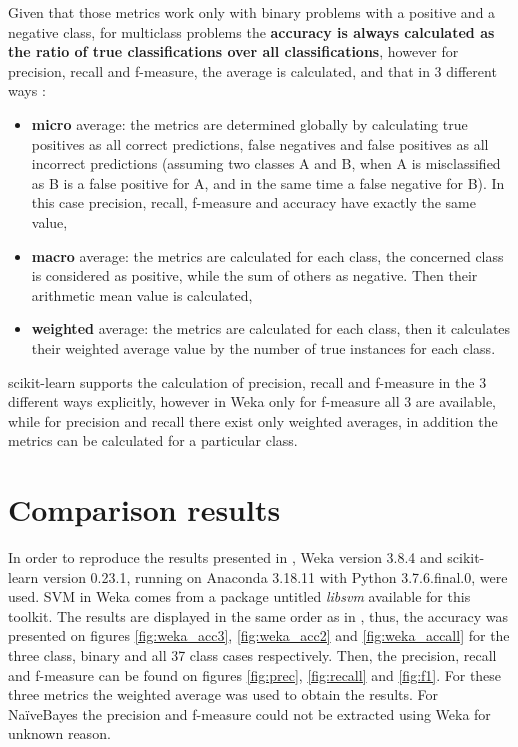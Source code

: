Given that those metrics work only with binary problems with a positive and a negative class, for multiclass problems the \textbf{accuracy is always calculated as the ratio of true classifications over all classifications}, however for precision, recall and f-measure, the average is calculated, and that in 3 different ways \cite{shmueli_multi-class_2020}:

\begin{itemize}
    \item \textbf{micro} average: the metrics are determined globally by calculating true positives as all correct predictions, false negatives and false positives as all incorrect predictions (assuming two classes A and B, when A is misclassified as B is a false positive for A, and in the same time a false negative for B). In this case precision, recall, f-measure and accuracy have exactly the same value,
    \item \textbf{macro} average: the metrics are calculated for each class, the concerned class is considered as positive, while the sum of others as negative. Then their arithmetic mean value is calculated,
    \item \textbf{weighted} average: the metrics are calculated for each class, then it calculates their weighted average value by the number of true instances for each class.
\end{itemize}

scikit-learn supports the calculation of precision, recall and f-measure in the 3 different ways explicitly, however in Weka only for f-measure all 3 are available, while for precision and recall there exist only weighted averages, in addition the metrics can be calculated for a particular class. 

\section{Comparison results}
In order to reproduce the results presented in \cite{borges_hink_machine_2014-1}, Weka version 3.8.4 and scikit-learn version 0.23.1, running on Anaconda 3.18.11 with Python 3.7.6.final.0, were used. SVM in Weka comes from a package untitled \textit{libsvm} available for this toolkit. The results are displayed in the same order as in \cite{borges_hink_machine_2014-1}, thus, the accuracy was presented on figures \ref{fig:weka_acc3}, \ref{fig:weka_acc2} and \ref{fig:weka_accall} for the three class, binary and all 37 class cases respectively. Then, the precision, recall and f-measure can be found on figures \ref{fig:prec}, \ref{fig:recall} and \ref{fig:f1}. For these three metrics the weighted average was used to obtain the results. For NaïveBayes the precision and f-measure could not be extracted using Weka for unknown reason.

